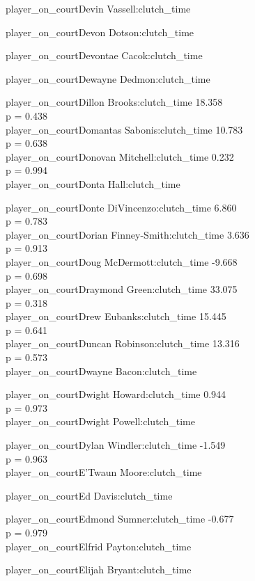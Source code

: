 \documentclass[
  landscape]{article}
\begin{document}
player\_on\_courtDevin Vassell:clutch\_time

player\_on\_courtDevon Dotson:clutch\_time

player\_on\_courtDevontae Cacok:clutch\_time

player\_on\_courtDewayne Dedmon:clutch\_time

player\_on\_courtDillon Brooks:clutch\_time 18.358\\
p = 0.438\\
player\_on\_courtDomantas Sabonis:clutch\_time 10.783\\
p = 0.638\\
player\_on\_courtDonovan Mitchell:clutch\_time 0.232\\
p = 0.994\\
player\_on\_courtDonta Hall:clutch\_time

player\_on\_courtDonte DiVincenzo:clutch\_time 6.860\\
p = 0.783\\
player\_on\_courtDorian Finney-Smith:clutch\_time 3.636\\
p = 0.913\\
player\_on\_courtDoug McDermott:clutch\_time -9.668\\
p = 0.698\\
player\_on\_courtDraymond Green:clutch\_time 33.075\\
p = 0.318\\
player\_on\_courtDrew Eubanks:clutch\_time 15.445\\
p = 0.641\\
player\_on\_courtDuncan Robinson:clutch\_time 13.316\\
p = 0.573\\
player\_on\_courtDwayne Bacon:clutch\_time

player\_on\_courtDwight Howard:clutch\_time 0.944\\
p = 0.973\\
player\_on\_courtDwight Powell:clutch\_time

player\_on\_courtDylan Windler:clutch\_time -1.549\\
p = 0.963\\
player\_on\_courtE'Twaun Moore:clutch\_time

player\_on\_courtEd Davis:clutch\_time

player\_on\_courtEdmond Sumner:clutch\_time -0.677\\
p = 0.979\\
player\_on\_courtElfrid Payton:clutch\_time

player\_on\_courtElijah Bryant:clutch\_time
\end{document}
